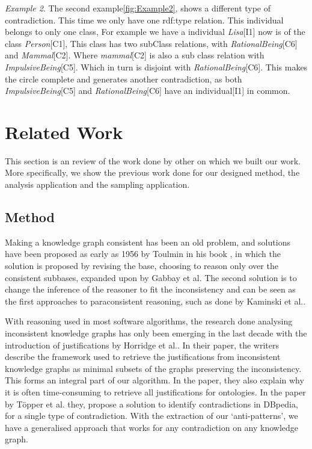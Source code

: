 \documentclass[11pt,letterpaper ,oneside ]{book}
\begin{document}
	\textit{Example 2}. The second example\ref{fig:Example2}, shows a different type of contradiction. This time we only have one rdf:type relation. This individual belongs to only one class, For example we have a individual \textit{Lisa}[I1] now is of the class \textit{Person}[C1], This class has two subClass relations, with \textit{RationalBeing}[C6] and \textit{Mammal}[C2]. Where \textit{mammal}[C2] is also a sub class relation with \textit{ImpulsiveBeing}[C5]. Which in turn is disjoint with \textit{RationalBeing}[C6]. This makes the circle complete and generates another contradiction, as both \textit{ImpulsiveBeing}[C5] and \textit{RationalBeing}[C6] have an individual[I1] in common. \\
	
	
	\chapter{Related Work}\label{RelatedWork}
	This section is an review of the work done by other on which we built our work. More specifically, we show the previous work done for our designed method, the analysis application and the sampling application. 
	
	\section{Method}
	Making a knowledge graph consistent has been an old problem, and solutions have been proposed as early as 1956 by Toulmin in his book \cite{toulmin:1956}, in which the solution is proposed by revising the base, choosing to reason only over the consistent subbases, expanded upon by Gabbay et al\cite{Gabbay:1994}. The second solution is to change the inference of the reasoner to fit the inconsistency and can be seen as the first approaches to paraconsistent reasoning, such as done by Kaminski et al.\cite{Kaminski:2015}.
	
	With reasoning used in most software algorithms, the research done analysing inconsistent knowledge graphs has only been emerging in the last decade with the introduction of justifications by Horridge et al.\cite{Horridge:2009}. In their paper, the writers describe the framework used to retrieve the justifications from inconsistent knowledge graphs as minimal subsets of the graphs preserving the inconsistency. This forms an integral part of our algorithm. In the paper, they also explain why it is often time-consuming to retrieve all justifications for ontologies. In the paper by T\"{o}pper et al.\cite{Topper:2012} they, propose a solution to identify contradictions in DBpedia, for a single type of contradiction. With the extraction of our `anti-patterns', we have a generalised approach that works for any contradiction on any knowledge graph. \\
	
\end{document}
